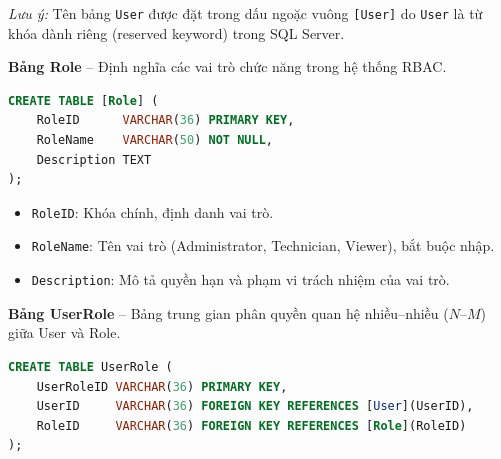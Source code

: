 \noindent\textit{Lưu ý:} Tên bảng \texttt{User} được đặt trong dấu ngoặc vuông \texttt{[User]} do \texttt{User} là từ khóa dành riêng (reserved keyword) trong SQL Server.

\vspace{0.5em}
\noindent\textbf{Bảng Role} -- Định nghĩa các vai trò chức năng trong hệ thống RBAC.

\begin{tcolorbox}[colback=gray!5, colframe=gray!60, title={\textbf{CREATE TABLE [Role]}}, fonttitle=\bfseries\small, boxrule=0.5pt, arc=2pt]
\begin{lstlisting}[language=SQL, basicstyle=\ttfamily\small, breaklines=true, showstringspaces=false, keywordstyle=\bfseries\color{blue!70!black}, stringstyle=\color{red!70!black}, commentstyle=\itshape\color{green!50!black}]
CREATE TABLE [Role] (
    RoleID      VARCHAR(36) PRIMARY KEY,
    RoleName    VARCHAR(50) NOT NULL,
    Description TEXT
);
\end{lstlisting}
\end{tcolorbox}

\begin{itemize}[leftmargin=2em]
    \item \texttt{RoleID}: Khóa chính, định danh vai trò.
    \item \texttt{RoleName}: Tên vai trò (Administrator, Technician, Viewer), bắt buộc nhập.
    \item \texttt{Description}: Mô tả quyền hạn và phạm vi trách nhiệm của vai trò.
\end{itemize}

\vspace{0.5em}
\noindent\textbf{Bảng UserRole} -- Bảng trung gian phân quyền quan hệ nhiều--nhiều ($N$--$M$) giữa User và Role.

\begin{tcolorbox}[colback=gray!5, colframe=gray!60, title={\textbf{CREATE TABLE UserRole}}, fonttitle=\bfseries\small, boxrule=0.5pt, arc=2pt]
\begin{lstlisting}[language=SQL, basicstyle=\ttfamily\small, breaklines=true, showstringspaces=false, keywordstyle=\bfseries\color{blue!70!black}, stringstyle=\color{red!70!black}, commentstyle=\itshape\color{green!50!black}]
CREATE TABLE UserRole (
    UserRoleID VARCHAR(36) PRIMARY KEY,
    UserID     VARCHAR(36) FOREIGN KEY REFERENCES [User](UserID),
    RoleID     VARCHAR(36) FOREIGN KEY REFERENCES [Role](RoleID)
);
\end{lstlisting}
\end{tcolorbox}

